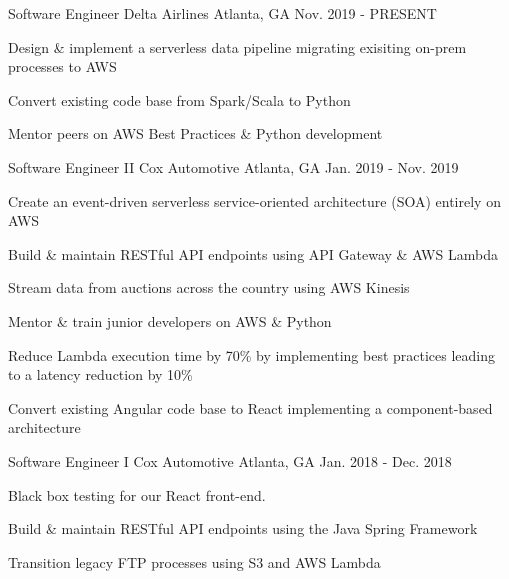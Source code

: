 
\begin{cventries}
  \cventry
    {Software Engineer} %
    {Delta Airlines} %
    {Atlanta, GA} %
    {Nov. 2019 - PRESENT} %
    {
      \begin{cvitems} %
        \item {Design \& implement a serverless data pipeline migrating exisiting on-prem processes to AWS}
        \item {Convert existing code base from Spark/Scala to Python}
        \item {Mentor peers on AWS Best Practices \& Python development}
      \end{cvitems}
    }

  \cventry
    {Software Engineer II} %
    {Cox Automotive} %
    {Atlanta, GA} %
    {Jan. 2019 - Nov. 2019} %
    {
      \begin{cvitems} %
        \item {Create an event-driven serverless service-oriented architecture (SOA) entirely on AWS}
        \item {Build \& maintain RESTful API endpoints using API Gateway \& AWS Lambda}
        \item {Stream data from auctions across the country using AWS Kinesis}
        \item {Mentor \& train junior developers on AWS \& Python}
        \item {Reduce Lambda execution time by 70\% by implementing best practices leading to a latency reduction by 10\%}
        \item {Convert existing Angular code base to React implementing a component-based architecture}
      \end{cvitems}
    }

  \cventry
    {Software Engineer I} %
    {Cox Automotive} %
    {Atlanta, GA} %
    {Jan. 2018 - Dec. 2018} %
    {
      \begin{cvitems} %
        \item {Black box testing for our React front-end.}
        \item {Build \& maintain RESTful API endpoints using the Java Spring Framework}
        \item {Transition legacy FTP processes using S3 and AWS Lambda}
      \end{cvitems}
    }
    

\end{cventries}
